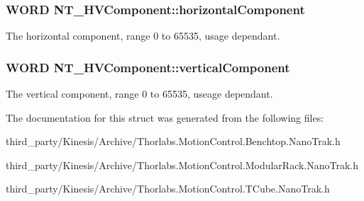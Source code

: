 \subsubsection[{\texorpdfstring{horizontal\+Component}{horizontalComponent}}]{\setlength{\rightskip}{0pt plus 5cm}W\+O\+RD N\+T\+\_\+\+H\+V\+Component\+::horizontal\+Component}\hypertarget{struct_n_t___h_v_component_a3b64a40a545d587d8c93a1d15ebbafe1}{}\label{struct_n_t___h_v_component_a3b64a40a545d587d8c93a1d15ebbafe1}


The horizontal component, range 0 to 65535, usage dependant. 

\subsubsection[{\texorpdfstring{vertical\+Component}{verticalComponent}}]{\setlength{\rightskip}{0pt plus 5cm}W\+O\+RD N\+T\+\_\+\+H\+V\+Component\+::vertical\+Component}\hypertarget{struct_n_t___h_v_component_ad99fd0bcf54a5ae6b498b8bee7fe9648}{}\label{struct_n_t___h_v_component_ad99fd0bcf54a5ae6b498b8bee7fe9648}


The vertical component, range 0 to 65535, useage dependant. 



The documentation for this struct was generated from the following files\+:\begin{DoxyCompactItemize}
\item 
third\+\_\+party/\+Kinesis/\+Archive/Thorlabs.\+Motion\+Control.\+Benchtop.\+Nano\+Trak.\+h\item 
third\+\_\+party/\+Kinesis/\+Archive/Thorlabs.\+Motion\+Control.\+Modular\+Rack.\+Nano\+Trak.\+h\item 
third\+\_\+party/\+Kinesis/\+Archive/Thorlabs.\+Motion\+Control.\+T\+Cube.\+Nano\+Trak.\+h\end{DoxyCompactItemize}
